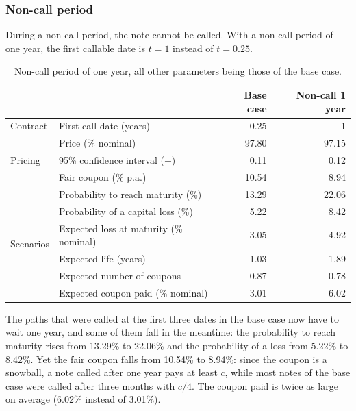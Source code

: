 \documentclass[11pt,a4paper]{article}
\begin{document}
\clearpage
\subsubsection{Non-call period}

During a non-call period, the note cannot be called. With a non-call period of one year, the first callable date is
$t = 1$ instead of $t = 0.25$.

\begin{table}[htbp]
  \centering
  \small
  \begin{tabular}{llrr}
    \toprule
     & & \textbf{Base case} & \textbf{Non-call 1 year} \\
    \midrule
    \multirow{1}{*}{Contract}
      & First call date (years) & 0.25 & 1 \\
    \midrule
    \multirow{3}{*}{Pricing}
      & Price (\% nominal) & 97.80 & 97.15 \\
      & 95\% confidence interval ($\pm$) & 0.11 & 0.12 \\
      & Fair coupon (\% p.a.) & 10.54 & 8.94 \\
    \midrule
    \multirow{6}{*}{Scenarios}
      & Probability to reach maturity (\%) & 13.29 & 22.06 \\
      & Probability of a capital loss (\%) & 5.22 & 8.42 \\
      & Expected loss at maturity (\% nominal) & 3.05 & 4.92 \\
      & Expected life (years) & 1.03 & 1.89 \\
      & Expected number of coupons & 0.87 & 0.78 \\
      & Expected coupon paid (\% nominal) & 3.01 & 6.02 \\
    \bottomrule
  \end{tabular}
  \caption{Non-call period of one year, all other parameters being those of the base case.}
  \label{tab:athena-noncall}
\end{table}

The paths that were called at the first three dates in the base case now have to wait one year, and some of them fall
in the meantime: the probability to reach maturity rises from 13.29\% to 22.06\% and the probability of a loss from
5.22\% to 8.42\%. Yet the fair coupon falls from 10.54\% to 8.94\%: since the coupon is a snowball, a note called after
one year pays at least $c$, while most notes of the base case were called after three months with $c/4$. The coupon
paid is twice as large on average (6.02\% instead of 3.01\%).
\end{document}
